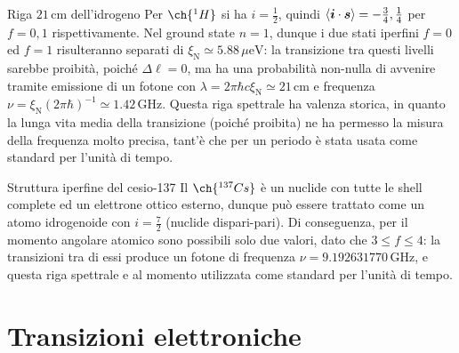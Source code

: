 \begin{example}{Riga $ 21\,\text{cm} $ dell'idrogeno}{}
	Per $ \ch{^1H} $ si ha $ i = \tfrac{1}{2} $, quindi $ \braket{\boldsymbol{i} \cdot \boldsymbol{s}} = - \tfrac{3}{4}, \tfrac{1}{4} $ per $ f = 0,1 $ rispettivamente. Nel ground state $ n = 1 $, dunque i due stati iperfini $ f = 0 $ ed $ f = 1 $ risulteranno separati di $ \xi_\text{N} \simeq 5.88\,\mu\text{eV} $: la transizione tra questi livelli sarebbe proibità, poiché $ \Delta \ell = 0 $, ma ha una probabilità non-nulla di avvenire tramite emissione di un fotone con $ \lambda = 2\pi \hbar c \xi_\text{N} \simeq 21\,\text{cm} $ e frequenza $ \nu = \xi_\text{N} (2\pi \hbar)^{-1} \simeq 1.42\,\text{GHz} $. Questa riga spettrale ha valenza storica, in quanto la lunga vita media della transizione (poiché proibita) ne ha permesso la misura della frequenza molto precisa, tant'è che per un periodo è stata usata come standard per l'unità di tempo.
\end{example}

\begin{example}{Struttura iperfine del cesio-137}{}
	Il $ \ch{^{137}Cs} $ è un nuclide con tutte le shell complete ed un elettrone ottico esterno, dunque può essere trattato come un atomo idrogenoide con $ i = \tfrac{7}{2} $ (nuclide dispari-pari). Di conseguenza, per il momento angolare atomico sono possibili solo due valori, dato che $ 3 \le f \le 4 $: la transizioni tra di essi produce un fotone di frequenza $ \nu = 9.192631770 \,\text{GHz} $, e questa riga spettrale e al momento utilizzata come standard per l'unità di tempo.
\end{example}

\section{Transizioni elettroniche}










